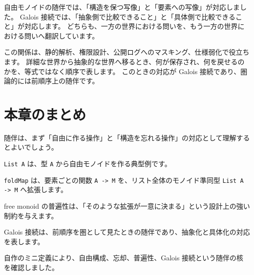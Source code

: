 自由モノイドの随伴では、「構造を保つ写像」と「要素への写像」が対応しました。
Galois 接続では、「抽象側で比較できること」と「具体側で比較できること」が対応します。
どちらも、一方の世界における問いを、もう一方の世界における問いへ翻訳しています。

この関係は、静的解析、権限設計、公開ログへのマスキング、仕様弱化で役立ちます。
詳細な世界から抽象的な世界へ移るとき、何が保存され、何を戻せるのかを、等式ではなく順序で表します。
このときの対応が Galois 接続であり、圏論的には前順序上の随伴です。

\section{本章のまとめ}
\label{sec:ch37-summary}

随伴は、まず「自由に作る操作」と「構造を忘れる操作」の対応として理解するとよいでしょう。

\texttt{List A} は、型 \texttt{A} から自由モノイドを作る典型例です。

\texttt{foldMap} は、要素ごとの関数 \texttt{A -> M} を、リスト全体のモノイド準同型 \texttt{List A -> M} へ拡張します。

free monoid の普遍性は、「そのような拡張が一意に決まる」という設計上の強い制約を与えます。

Galois 接続は、前順序を圏として見たときの随伴であり、抽象化と具体化の対応を表します。

自作のミニ定義により、自由構成、忘却、普遍性、Galois 接続という随伴の核を確認しました。
